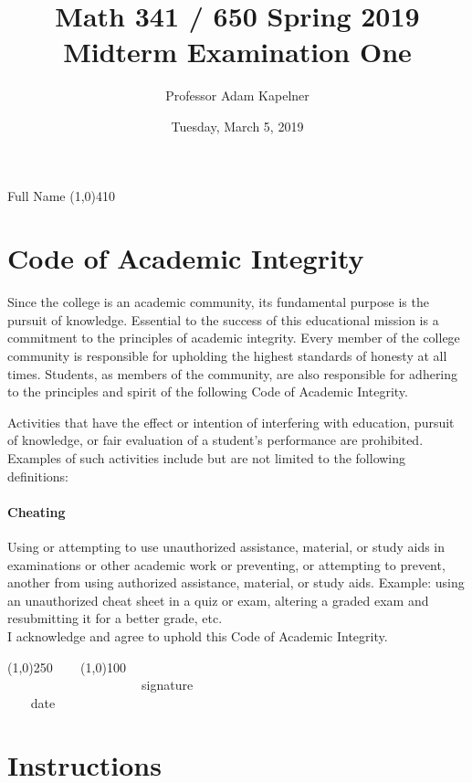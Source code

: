 \documentclass[12pt]{article}
\title{Math 341 / 650 Spring 2019 \\ Midterm Examination One}
\author{Professor Adam Kapelner}
\date{Tuesday, March 5, 2019}
\begin{document}
\maketitle

\noindent Full Name \line(1,0){410}

\thispagestyle{empty}

\section*{Code of Academic Integrity}

\footnotesize
Since the college is an academic community, its fundamental purpose is the pursuit of knowledge. Essential to the success of this educational mission is a commitment to the principles of academic integrity. Every member of the college community is responsible for upholding the highest standards of honesty at all times. Students, as members of the community, are also responsible for adhering to the principles and spirit of the following Code of Academic Integrity.

Activities that have the effect or intention of interfering with education, pursuit of knowledge, or fair evaluation of a student's performance are prohibited. Examples of such activities include but are not limited to the following definitions:

\paragraph{Cheating} Using or attempting to use unauthorized assistance, material, or study aids in examinations or other academic work or preventing, or attempting to prevent, another from using authorized assistance, material, or study aids. Example: using an unauthorized cheat sheet in a quiz or exam, altering a graded exam and resubmitting it for a better grade, etc.
\\

\noindent I acknowledge and agree to uphold this Code of Academic Integrity. \\

\begin{center}
\line(1,0){250} ~~~ \line(1,0){100}\\
~~~~~~~~~~~~~~~~~~~~~signature~~~~~~~~~~~~~~~~~~~~~~~~~~~~~~~~~~~~~~~~~~~~~ date
\end{center}

\normalsize

\section*{Instructions}
\end{document}
